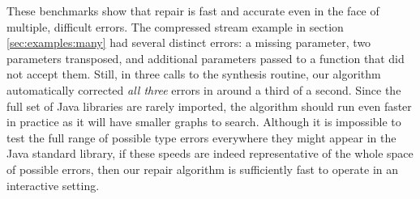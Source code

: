 These benchmarks show that repair is fast and accurate even in the face of multiple, difficult errors. The compressed stream example in section \ref{sec:examples:many} had several distinct errors: a missing parameter, two parameters transposed, and additional parameters passed to a function that did not accept them. Still, in three calls to the synthesis routine, our algorithm automatically corrected \textit{all three} errors in around a third of a second. Since the full set of Java libraries are rarely imported, the algorithm should run even faster in practice as it will have smaller graphs to search. Although it is impossible to test the full range of possible type errors everywhere they might appear in the Java standard library, if these speeds are indeed representative of the whole space of possible errors, then our repair algorithm is sufficiently fast to operate in an interactive setting.
